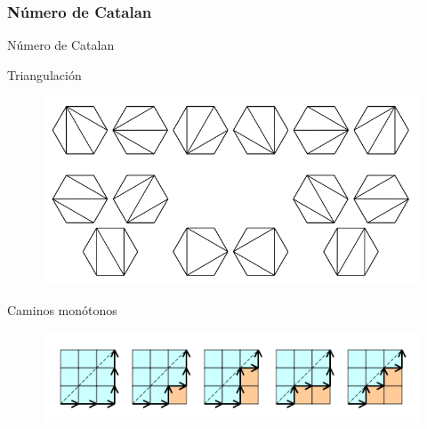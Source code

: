 \subsubsection{Número de Catalan}

\begin{frame}{Número de Catalan}
	\begin{block}{Triangulación}
		\begin{figure}
			\centering
			\includegraphics[height=0.3\paperheight]{ca1}
		\end{figure}
	\end{block}
	
	\begin{block}{Caminos monótonos}
		\begin{figure}
			\centering
			\includegraphics[height=0.3\paperheight]{ca2}
		\end{figure}
	\end{block}
\end{frame}
